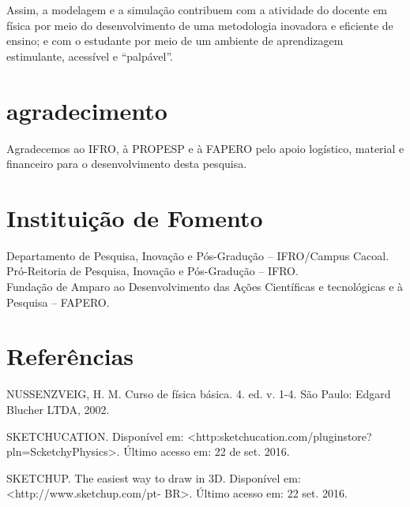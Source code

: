 \documentclass[article,12pt,onesidea,4paper,english,brazil]{abntex2}
\begin{document}
	Assim, a modelagem e a simulação contribuem com a atividade do docente em física por meio do desenvolvimento de uma metodologia inovadora e eficiente de ensino; e com o estudante por meio de um ambiente de aprendizagem estimulante, acessível e “palpável”.
	\section*{agradecimento}
	
	Agradecemos ao IFRO, à PROPESP e à FAPERO pelo apoio logístico, material e financeiro para o desenvolvimento desta pesquisa.
	\section*{Instituição de Fomento}
	
Departamento de Pesquisa, Inovação e Pós-Gradução – IFRO/Campus Cacoal. Pró-Reitoria de Pesquisa, Inovação e Pós-Gradução – IFRO.
\\Fundação de Amparo ao Desenvolvimento das Ações Científicas e tecnológicas e à Pesquisa – FAPERO.

	
	\section*{Referências}
		\noindent NUSSENZVEIG, H. M. Curso de física básica. 4. ed. v. 1-4. São Paulo: Edgard Blucher LTDA, 2002.
		
	\noindent	SKETCHUCATION.	Disponível	em:
		<http:sketchucation.com/pluginstore?pln=ScketchyPhysics>. Último acesso em: 22 de set. 2016.
		
	\noindent	SKETCHUP. The easiest way to draw in 3D. Disponível em: <http://www.sketchup.com/pt- BR>. Último acesso em: 22 set. 2016.
\end{document}
